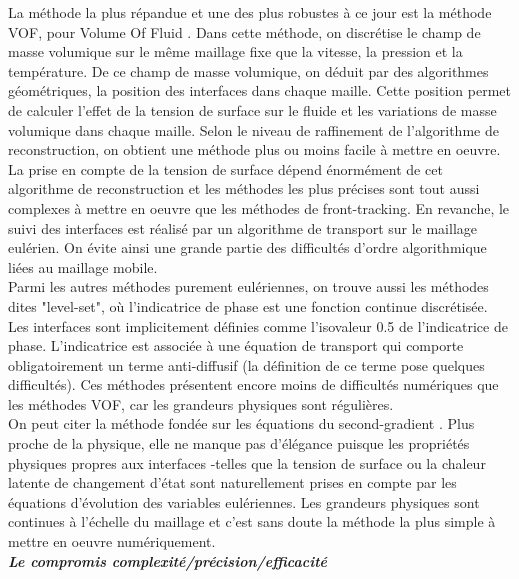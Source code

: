 La m\'ethode la plus r\'epandue et une des plus robustes \`a ce jour est la m\'ethode VOF, pour Volume Of Fluid \cite{Hirt1981}. Dans cette m\'ethode, on discr\'etise le champ de masse volumique sur le m\^eme maillage fixe que la
vitesse, la pression et la temp\'erature. De ce champ de masse volumique, on d\'eduit par des algorithmes g\'eom\'etriques, la position des interfaces dans chaque maille. Cette position permet de calculer l'effet de la tension de
surface sur le fluide et les variations de masse volumique dans chaque maille. Selon le niveau de raffinement de l'algorithme de reconstruction, on obtient une m\'ethode plus ou moins facile à mettre en oeuvre. La prise en compte
de la tension de surface d\'epend \'enorm\'ement de cet algorithme de reconstruction et les m\'ethodes les plus pr\'ecises sont tout aussi complexes à mettre en oeuvre que les m\'ethodes de front-tracking. En revanche, le suivi des
interfaces est r\'ealis\'e par un algorithme de transport sur le maillage eul\'erien. On \'evite ainsi une grande partie des difficult\'es d'ordre algorithmique li\'ees au maillage mobile.\\
Parmi les autres m\'ethodes purement eul\'eriennes, on trouve aussi les m\'ethodes dites "level-set", o\`u l'indicatrice de phase est une fonction continue discr\'etis\'ee. Les interfaces sont implicitement d\'efinies comme l'isovaleur 0.5 de l'indicatrice de phase. L'indicatrice est associ\'ee à une \'equation de transport qui comporte obligatoirement un terme anti-diffusif (la d\'efinition de ce terme pose quelques difficult\'es). Ces m\'ethodes pr\'esentent encore moins de difficult\'es num\'eriques que les m\'ethodes VOF, car les grandeurs physiques sont r\'eguli\`eres.\\
On peut citer la m\'ethode fond\'ee sur les \'equations du second-gradient \cite{Jamet2001}.
Plus proche de la physique, elle ne manque pas d'\'el\'egance puisque les propri\'et\'es physiques propres aux interfaces -telles que la tension de surface ou la chaleur latente de changement d'\'etat sont naturellement prises en compte par les \'equations d'\'evolution des variables eul\'eriennes. Les grandeurs physiques sont continues \`a l'\'echelle du maillage et c'est sans doute la m\'ethode la plus simple à mettre en oeuvre num\'eriquement.\smallskip \\

\textit{\textbf{Le compromis complexit\'e/pr\'ecision/efficacit\'e}}\smallskip \\

